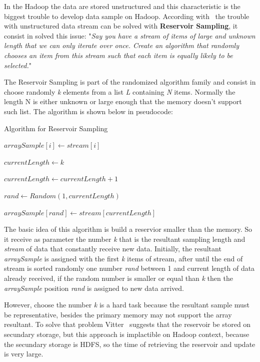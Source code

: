 In the Hadoop the data are stored unstructured and this characteristic is the
biggest trouble to develop data sample on Hadoop. According with~\cite{vitter:1985, cloudera, wikipedia:ReservoirSampling}
the trouble with unstructured data stream can be solved with {\bf Reservoir Sampling},
it consist in solved this issue: "{\it Say you have a stream of items of large
and unknown length that we can only iterate over once. Create an algorithm that
randomly chooses an item from this stream such that each item is equally likely
to be selected.}"

The Reservoir Sampling is part of the randomized algorithm family and consist in
choose randomly {\it k} elements from a list {\it L} containing {\it N} items. Normally
the length N is either unknown or large enough that the memory doesn't support such
list. The algorithm is shown below in pseudocode:

\begin{algorithm}
		\caption{Algorithm for Reservoir Sampling \label{alg:sample}}


		 {
			$arraySample[i] \leftarrow stream[i]$
		}

		$currentLength \leftarrow k$

		 {
			$currentLength \leftarrow currentLength + 1$

			$rand \leftarrow Random(1, currentLength)$

			{
				$arraySample[rand] \leftarrow stream[currentLength]$
			}
		}

\end{algorithm}

The basic idea of this algorithm is build a reservior smaller than the memory. So
it receive as parameter the number {\it k} that is the resultant sampling length
and {\it stream} of data that constantly receive new data. Initially, the resultant
{\it arraySample} is assigned with the first {\it k} items of stream, after until
the end of stream is sorted randomly one number {\it rand} between 1 and current
length of data already received, if the random number is smaller or equal than {\it k}
then the {\it arraySample} position {\it rand} is assigned to new data arrived.

However, choose the number {\it k} is a hard task because the resultant sample must
be representative, besides the primary memory may not support the array resultant.
To solve that problem Vitter~\cite{vitter:1985} suggests that the reservoir be stored
on secundary storage, but this approach is implactible on Hadoop context, because
the secundary storage is HDFS, so the time of retrieving the reservoir and update
is very large.

